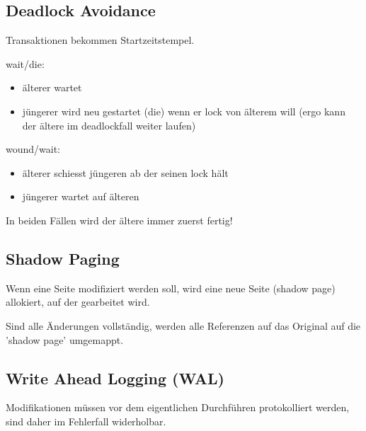 \documentclass[10pt,a4paper,oneside]{report}
\begin{document}
\subsection*{Deadlock Avoidance}

Transaktionen bekommen Startzeitstempel.

wait/die:

\begin{itemize}
\item älterer wartet
\item jüngerer wird neu gestartet (die) wenn er lock von älterem will (ergo kann der ältere im deadlockfall weiter laufen)
\end{itemize}

wound/wait:

\begin{itemize}
\item älterer schiesst jüngeren ab der seinen lock hält
\item jüngerer wartet auf älteren
\end{itemize}

In beiden Fällen wird der ältere immer zuerst fertig!

\subsection*{Shadow Paging}

Wenn eine Seite modifiziert werden soll, wird eine neue Seite (shadow page) allokiert, auf der gearbeitet wird.

Sind alle Änderungen vollständig, werden alle Referenzen auf das Original auf die 'shadow page' umgemappt.

\subsection{Write Ahead Logging (WAL)}

Modifikationen müssen vor dem eigentlichen Durchführen protokolliert werden, sind daher im Fehlerfall widerholbar.
\end{document}
